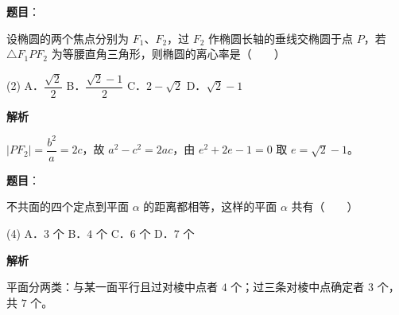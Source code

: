 \begin{answer}

\textbf{题目}：

设椭圆的两个焦点分别为 $F_1$、$F_2$，过 $F_2$ 作椭圆长轴的垂线交椭圆于点 $P$，若 $\triangle F_1PF_2$ 为等腰直角三角形，则椭圆的离心率是\mbox{（　　）}

\begin{gkopts}(2)
\task A．$\dfrac{\sqrt{2}}{2}$
\task B．$\dfrac{\sqrt{2} - 1}{2}$
\task C．$2 - \sqrt{2}$
\task D．$\sqrt{2} - 1$
\end{gkopts}

\textbf{解析}

$|PF_2| = \dfrac{b^2}{a} = 2c$，故 $a^2 - c^2 = 2ac$，由 $e^2 + 2e - 1 = 0$ 取 $e = \sqrt{2} - 1$。


\end{answer}
\begin{answer}

\textbf{题目}：

不共面的四个定点到平面 $\alpha$ 的距离都相等，这样的平面 $\alpha$ 共有\mbox{（　　）}

\begin{gkopts}(4)
\task A．$3$ 个
\task B．$4$ 个
\task C．$6$ 个
\task D．$7$ 个
\end{gkopts}

\textbf{解析}

平面分两类：与某一面平行且过对棱中点者 $4$ 个；过三条对棱中点确定者 $3$ 个，共 $7$ 个。


\end{answer}
